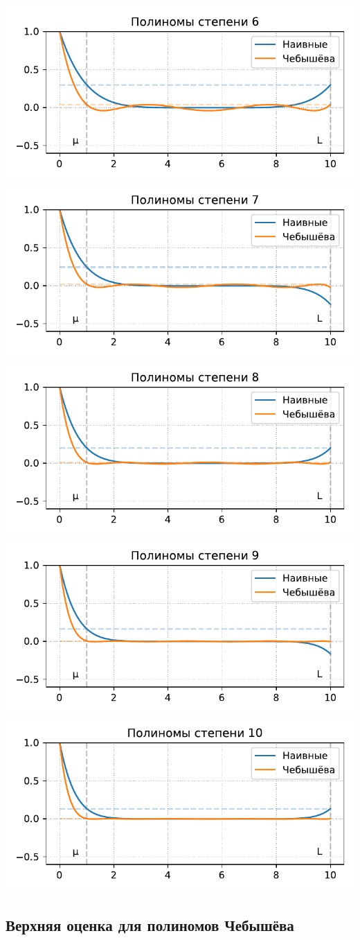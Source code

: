 \documentclass[
  russian,
  letterpaper,
  DIV=11,
  numbers=noendperiod]{scrartcl}
\begin{document}
\includegraphics[width=0.5\columnwidth,height=0.8\textheight,keepaspectratio]{gd_polynoms_6_ru.pdf}
\includegraphics[width=0.5\columnwidth,height=0.8\textheight,keepaspectratio]{gd_polynoms_7_ru.pdf}
\includegraphics[width=0.5\columnwidth,height=0.8\textheight,keepaspectratio]{gd_polynoms_8_ru.pdf}
\includegraphics[width=0.5\columnwidth,height=0.8\textheight,keepaspectratio]{gd_polynoms_9_ru.pdf}
\includegraphics[width=0.5\columnwidth,height=0.8\textheight,keepaspectratio]{gd_polynoms_10_ru.pdf}

\subsection{Верхняя оценка для полиномов
Чебышёва}\label{ux432ux435ux440ux445ux43dux44fux44f-ux43eux446ux435ux43dux43aux430-ux434ux43bux44f-ux43fux43eux43bux438ux43dux43eux43cux43eux432-ux447ux435ux431ux44bux448ux451ux432ux430}
\end{document}
